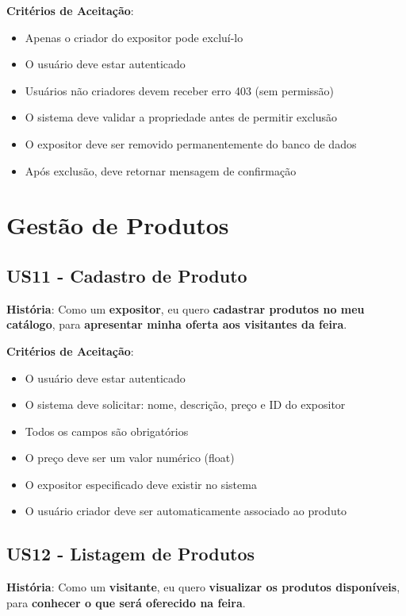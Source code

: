 \documentclass[12pt,a4paper]{article}
\begin{document}
\textbf{Critérios de Aceitação}:
\begin{itemize}
    \item Apenas o criador do expositor pode excluí-lo
    \item O usuário deve estar autenticado
    \item Usuários não criadores devem receber erro 403 (sem permissão)
    \item O sistema deve validar a propriedade antes de permitir exclusão
    \item O expositor deve ser removido permanentemente do banco de dados
    \item Após exclusão, deve retornar mensagem de confirmação
\end{itemize}

\section{Gestão de Produtos}

\subsection{US11 - Cadastro de Produto}

\textbf{História}: Como um \textbf{expositor}, eu quero \textbf{cadastrar produtos no meu catálogo}, para \textbf{apresentar minha oferta aos visitantes da feira}.

\textbf{Critérios de Aceitação}:
\begin{itemize}
    \item O usuário deve estar autenticado
    \item O sistema deve solicitar: nome, descrição, preço e ID do expositor
    \item Todos os campos são obrigatórios
    \item O preço deve ser um valor numérico (float)
    \item O expositor especificado deve existir no sistema
    \item O usuário criador deve ser automaticamente associado ao produto
\end{itemize}

\subsection{US12 - Listagem de Produtos}

\textbf{História}: Como um \textbf{visitante}, eu quero \textbf{visualizar os produtos disponíveis}, para \textbf{conhecer o que será oferecido na feira}.
\end{document}
